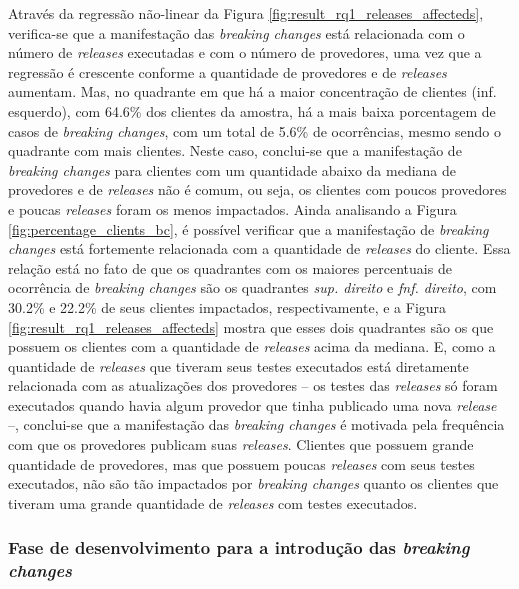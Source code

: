 Através da regressão não-linear da Figura \ref{fig:result_rq1_releases_affecteds}, verifica-se que a manifestação das \textit{breaking changes} está relacionada com o número de \textit{releases} executadas e com o número de provedores, uma vez que a regressão é crescente conforme a quantidade de provedores e de \textit{releases} aumentam. Mas, no quadrante em que há a maior concentração de clientes (inf. esquerdo), com 64.6\% dos clientes da amostra, há a mais baixa porcentagem de casos de \textit{breaking changes}, com um total de 5.6\% de ocorrências, mesmo sendo o quadrante com mais clientes. Neste caso, conclui-se que a manifestação de \textit{breaking changes} para clientes com um quantidade abaixo da mediana de provedores e de \textit{releases} não é comum, ou seja, os clientes com poucos provedores e poucas \textit{releases} foram os menos impactados. Ainda analisando a Figura \ref{fig:percentage_clients_bc}, é possível verificar que a manifestação de \textit{breaking changes} está fortemente relacionada com a quantidade de \textit{releases} do cliente. Essa relação está no fato de que os quadrantes com os maiores percentuais de ocorrência de \textit{breaking changes} são os quadrantes \textit{sup. direito} e \textit{fnf. direito}, com 30.2\% e 22.2\% de seus clientes impactados, respectivamente, e a Figura \ref{fig:result_rq1_releases_affecteds} mostra que esses dois quadrantes são os que possuem os clientes com a quantidade de \textit{releases} acima da mediana. E, como a quantidade de \textit{releases} que tiveram seus testes executados está diretamente relacionada com as atualizações dos provedores -- os testes das \textit{releases} só foram executados quando havia algum provedor que tinha publicado uma nova \textit{release} --, conclui-se que a manifestação das \textit{breaking changes} é motivada pela frequência com que os provedores publicam suas \textit{releases}. Clientes que possuem grande quantidade de provedores, mas que possuem poucas \textit{releases} com seus testes executados, não são tão impactados por \textit{breaking changes} quanto os clientes que tiveram uma grande quantidade de \textit{releases} com testes executados.

\subsubsection{Fase de desenvolvimento para a introdução das \textit{breaking changes}}

